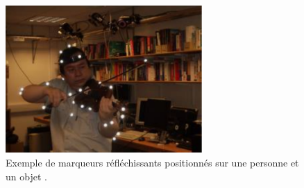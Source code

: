 \begin{figure}
    \centering
    \includegraphics[width=7.5cm]{pictures/markers.png}
    \caption[Marqueurs réfléchissants sur une personne et un objet \parencite{Ng2008}]{Exemple de marqueurs réfléchissants positionnés sur une personne et un objet \parencite{Ng2008}.}
    \label{fig:markers}
\end{figure}


